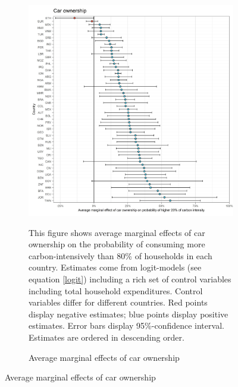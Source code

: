  \begin{figure}[ht!]\ContinuedFloat
   \centering
   \begin{subfigure}[b]{\textwidth}
   \centering
   \caption{Average marginal effects of car ownership} \label{fig:Logit_ME_car}
   \includegraphics{1_Figures/Analysis_Logit_Models_Marginal_Effects/Average_Marginal_Effects_affected_upper_80_car.01_2017.jpg}
   \begin{subcaption2}
     This figure shows average marginal effects of car ownership on the probability of consuming more carbon-intensively than 80\% of households in each country. Estimates come from logit-models (see equation \ref{logit}) including a rich set of control variables including total household expenditures. Control variables differ for different countries. Red points display negative estimates; blue points display positive estimates. Error bars display 95\%-confidence interval. Estimates are ordered in descending order.
   \end{subcaption2}
   \end{subfigure}
 \end{figure}
 \clearpage

